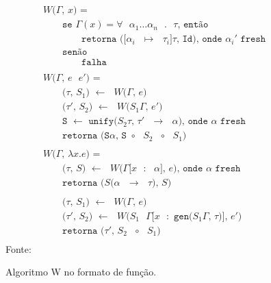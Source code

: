 \begin{figure}[ht!]
  \caption{Algoritmo W no formato de função.}
  \centering
  \begin{align*}
     & \texttt{$W$($\Gamma$, $x$) = }                                                                             \\
     & \qquad{}\texttt{se $\Gamma(x) = \forall$ $\alpha_1 \ldots \alpha_n$ $.$ $\tau$, então}                     \\
     & \qquad{}\qquad{}\texttt{retorna ([$\alpha_i$ $\mapsto$ $\tau_i$]$\tau$, Id), onde $\alpha_i'$ fresh}       \\
     & \qquad{}\texttt{senão}                                                                                     \\
     & \qquad{}\qquad{}\texttt{falha}                                                                             \\
    \\
     & \texttt{$W$($\Gamma$, $e$ $e'$) = }                                                                        \\
     & \qquad{}\texttt{($\tau$, $S_1$) $\leftarrow$ $W$($\Gamma$, $e$)}                                           \\
     & \qquad{}\texttt{($\tau'$, $S_2$) $\leftarrow$ $W$($S_1\Gamma$, $e'$)}                                      \\
     & \qquad{}\texttt{S $\leftarrow$ unify($S_2\tau$, $\tau'$ $\to$ $\alpha$), onde $\alpha$ fresh}              \\
     & \qquad{}\texttt{retorna (S$\alpha$, S $\circ$ $S_2$ $\circ$ $S_1$)}                                        \\
    \\
     & \texttt{$W$($\Gamma$, $\lambda x.e$) = }                                                                   \\
     & \qquad{}\texttt{($\tau$, $S$) $\leftarrow$ $W$($\Gamma$[$x$ $:$ $\alpha$], $e$), onde $\alpha$ fresh}      \\
     & \qquad{}\texttt{retorna ($S$($\alpha$ $\to$ $\tau$), $S$)}                                                 \\
    \\
     & \qquad{}\texttt{($\tau$, $S_1$) $\leftarrow$ $W$($\Gamma$, $e$)}                                           \\
     & \qquad{}\texttt{($\tau'$, $S_2$) $\leftarrow$ $W$($S_1$ $\Gamma$[$x$ $:$ gen($S_1\Gamma$, $\tau$)], $e'$)} \\
     & \qquad{}\texttt{retorna ($\tau'$, $S_2$ $\circ$ $S_1$)}                                                    \\
  \end{align*}
  \small{Fonte:~\cite{CASTRO2019}}\label{algo:w}
\end{figure}

